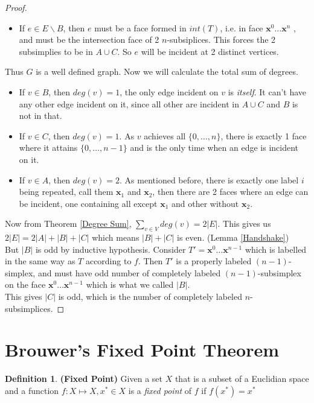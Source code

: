 \documentclass{article}
\theoremstyle{definition}
\newtheorem{defn}[theorem]{Definition}
\begin{document}
\begin{proof}
\begin{itemize}
	\item If $e \in E \backslash B$, then $e$ must be a face formed in $int(T)$, i.e. in face $\mathbf{x}^0 \dots \mathbf{x}^n$ , and must be the intersection face of 2 $n$-subsiplices. This forces the 2 subsimplies to be in $A\cup C$. So $e$ will be incident at 2 distinct vertices.
\end{itemize}
Thus $G$ is a well defined graph. Now we will calculate the total sum of degrees. 
\begin{itemize}
\item If $v\in B$, then $deg(v) = 1$, the only edge incident on $v$ is \textit{itself}. It can't have any other edge incident on it, since all other are incident in $A\cup C$ and $B$ is not in that.
\item If $v\in C$, then $deg(v) = 1$. As $v$ achieves all $\{0,\dots,n\}$, there is exactly 1 face where it attains $\{0,\dots, n-1\}$ and is the only time when an edge is incident on it.
\item If $v \in A$, then $deg(v) = 2$. As mentioned before, there is exactly one label $i$ being repeated, call them $\mathbf{x}_1$ and $\mathbf{x}_2$, then there are 2 faces where an edge can be incident, one containing all except $\mathbf{x}_1$ and other without $\mathbf{x}_2$.
\end{itemize}
Now from Theorem \ref{Degree Sum}, $\sum_{v\in V} deg(v) = 2|E|$. This gives us $2|E| = 2|A|+|B|+|C|$ which means $|B|+|C|$ is even. (Lemma \ref{Handshake})\\

But $|B|$ is odd by inductive hypothesis. Consider $T' = \mathbf{x}^0 \dots \mathbf{x}^{n-1}$ which is labelled in the same way as $T$ according to $f$. Then $T'$ is a properly labeled $(n-1)$-simplex, and must have odd number of completely labeled $(n-1)$-subsimplex on the face $\mathbf{x}^0 \dots \mathbf{x}^{n-1}$ which is what we called $|B|$.\\

This gives $|C|$ is odd, which is the number of completely labeled $n$-subsimplices.
\end{proof}

\section{Brouwer's Fixed Point Theorem}
\begin{defn}
\textbf{(Fixed Point)} Given a set $X$ that is a subset of a Euclidian space and a function $f: X\mapsto X, x^*\in X$ is a \textit{fixed point} of $f$ if $f(x^*) = x^*$
\end{defn}
\end{document}
